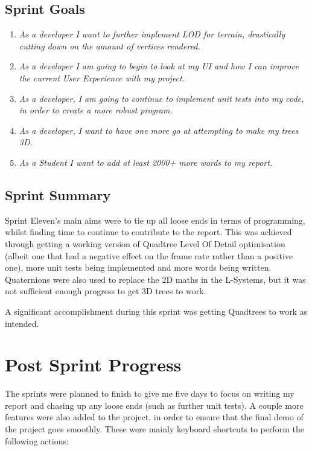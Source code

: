 \documentclass[a4paper,10pt]{report}
\begin{document}
\subsection{Sprint Goals}
\begin{enumerate}
    \item\textit{ As a developer I want to further implement LOD for terrain, drastically cutting down on the amount of vertices rendered.}

\item\textit{ As a developer I am going to begin to look at my UI and how I can improve the current User Experience with my project.}

\item\textit{ As a developer, I am going to continue to implement unit tests into my code, in order to create a more robust program. }

\item\textit{ As a developer, I want to have one more go at attempting to make my trees 3D. }

\item\textit{ As a Student I want to add at least 2000+ more words to my report.}

\end{enumerate}

\subsection{Sprint Summary}
Sprint Eleven's main aims were to tie up all loose ends in terms of programming, whilst finding time to continue to contribute to the report. This was achieved through getting a working version of Quadtree Level Of Detail optimisation (albeit one that had a negative effect on the frame rate rather than a positive one), more unit tests being implemented and more words being written. Quaternions were also used to replace the 2D maths in the L-Systems, but it was not sufficient enough progress to get 3D trees to work. \medskip

A significant accomplishment during this sprint was getting Quadtrees to work as intended.

\section{Post Sprint Progress}
The sprints were planned to finish to give me five days to focus on writing my report and chasing up any loose ends (such as further unit tests). A couple more features were also added to the project, in order to ensure that the final demo of the project goes smoothly. These were mainly keyboard shortcuts to perform the following actions:
\end{document}
